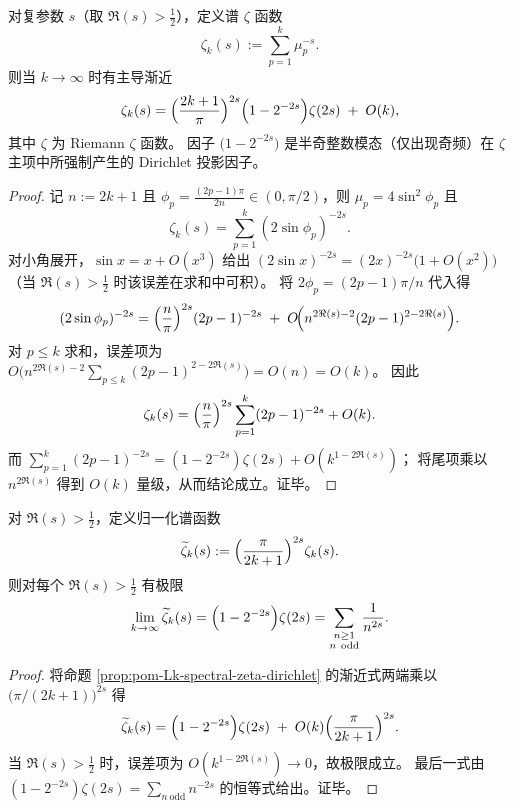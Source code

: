 \begin{proposition}\label{prop:pom-Lk-spectral-zeta-dirichlet}
对复参数 \(s\)（取 \(\Re(s)>\tfrac12\)），定义谱 \(\zeta\) 函数
\[
\zeta_k(s):=\sum_{p=1}^{k}\mu_p^{-s}.
\]
则当 \(k\to\infty\) 时有主导渐近
\[
\zeta_k(s)
=\Bigl(\frac{2k+1}{\pi}\Bigr)^{2s}\Bigl(1-2^{-2s}\Bigr)\zeta(2s)
\;+\;O(k),
\]
其中 \(\zeta\) 为 Riemann \(\zeta\) 函数。
因子 \(\bigl(1-2^{-2s}\bigr)\) 是半奇整数模态（仅出现奇频）在 \(\zeta\) 主项中所强制产生的 Dirichlet 投影因子。
\end{proposition}
\begin{proof}
记 \(n:=2k+1\) 且 \(\phi_p=\frac{(2p-1)\pi}{2n}\in(0,\pi/2)\)，则 \(\mu_p=4\sin^2\phi_p\) 且
\[
\zeta_k(s)=\sum_{p=1}^{k}(2\sin\phi_p)^{-2s}.
\]
对小角展开，\(\sin x=x+O(x^3)\) 给出 \((2\sin x)^{-2s}=(2x)^{-2s}\bigl(1+O(x^2)\bigr)\)（当 \(\Re(s)>\tfrac12\) 时该误差在求和中可积）。
将 \(2\phi_p=(2p-1)\pi/n\) 代入得
\[
(2\sin\phi_p)^{-2s}
=\Bigl(\frac{n}{\pi}\Bigr)^{2s}(2p-1)^{-2s}
\;+\;O\!\Bigl(n^{2\Re(s)-2}(2p-1)^{2-2\Re(s)}\Bigr).
\]
对 \(p\le k\) 求和，误差项为
\(
O\bigl(n^{2\Re(s)-2}\sum_{p\le k}(2p-1)^{2-2\Re(s)}\bigr)=O(n)=O(k)
\)。
因此
\[
\zeta_k(s)=\Bigl(\frac{n}{\pi}\Bigr)^{2s}\sum_{p=1}^{k}(2p-1)^{-2s}+O(k).
\]
而 \(\sum_{p=1}^{k}(2p-1)^{-2s}=(1-2^{-2s})\zeta(2s)+O(k^{1-2\Re(s)})\)；
将尾项乘以 \(n^{2\Re(s)}\) 得到 \(O(k)\) 量级，从而结论成立。证毕。
\end{proof}

\begin{corollary}\label{cor:pom-Lk-normalized-zeta-odd-projection}
对 \(\Re(s)>\tfrac12\)，定义归一化谱函数
\[
\widetilde\zeta_k(s):=\Bigl(\frac{\pi}{2k+1}\Bigr)^{2s}\zeta_k(s).
\]
则对每个 \(\Re(s)>\tfrac12\) 有极限
\[
\lim_{k\to\infty}\widetilde\zeta_k(s)
=\Bigl(1-2^{-2s}\Bigr)\zeta(2s)
=\sum_{\substack{n\ge 1\\ n\ \mathrm{odd}}}\frac{1}{n^{2s}}.
\]
\end{corollary}
\begin{proof}
将命题 \ref{prop:pom-Lk-spectral-zeta-dirichlet} 的渐近式两端乘以 \(\bigl(\pi/(2k+1)\bigr)^{2s}\) 得
\[
\widetilde\zeta_k(s)
=\Bigl(1-2^{-2s}\Bigr)\zeta(2s)
\;+\;
O(k)\Bigl(\frac{\pi}{2k+1}\Bigr)^{2s}.
\]
当 \(\Re(s)>\tfrac12\) 时，误差项为 \(O(k^{1-2\Re(s)})\to 0\)，故极限成立。
最后一式由
\(
(1-2^{-2s})\zeta(2s)=\sum_{n\ \mathrm{odd}} n^{-2s}
\)
的恒等式给出。证毕。
\end{proof}

